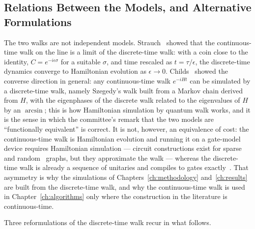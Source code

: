\subsection{Relations Between the Models, and Alternative Formulations}
\label{sec:dtqw-alternatives}
The two walks are not independent models. Strauch~\cite{strauch2006connecting}
showed that the continuous-time walk on the line is a limit of the
discrete-time walk: with a coin close to the identity, $C = e^{-i\epsilon
\sigma}$ for a suitable $\sigma$, and time rescaled as $t = \tau/\epsilon$,
the discrete-time dynamics converge to Hamiltonian evolution as $\epsilon \to
0$. Childs~\cite{Childs2010} showed the converse direction in general: any
continuous-time walk $e^{-iHt}$ can be simulated by a discrete-time walk,
namely Szegedy's walk built from a Markov chain derived from $H$, with the
eigenphases of the discrete walk related to the eigenvalues of $H$ by an
$\arcsin$; this is how Hamiltonian simulation by quantum walk works, and it
is the sense in which the committee's remark that the two models are
``functionally equivalent'' is correct. It is not, however, an equivalence of
cost: the continuous-time walk is Hamiltonian evolution and running it on a
gate-model device requires Hamiltonian simulation --- circuit constructions
exist for sparse~\cite{Chen_2024a} and random~\cite{Chakraborty_2025} graphs,
but they approximate the walk --- whereas the discrete-time walk is already a
sequence of unitaries and compiles to gates exactly~\cite{Douglas_2007,
Acasiete_2020}. That asymmetry is why the simulations of
Chapters~\ref{ch:methodology} and~\ref{ch:results} are built from the
discrete-time walk, and why the continuous-time walk is used in
Chapter~\ref{ch:algorithms} only where the construction in the literature
is continuous-time.

Three reformulations of the discrete-time walk recur in what follows.

